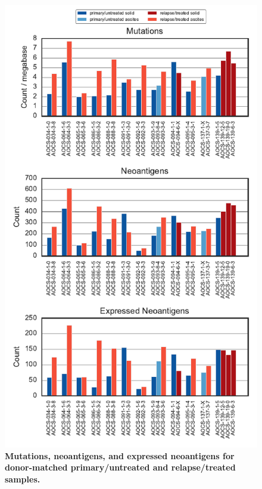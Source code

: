 \documentclass{article}
\begin{document}
\begin{figure}
\centering
\includegraphics[scale=1.0]{../figures/paired_counts.pdf}
\caption{\textbf{Mutations, neoantigens, and expressed neoantigens for donor-matched primary/untreated and relapse/treated samples.}}
\label{fig:supp_paired}
\end{figure}
\end{document}
